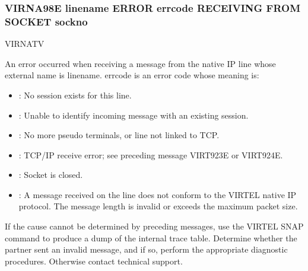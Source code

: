 \documentclass[letterpaper,10pt,english]{sphinxmanual}
\begin{document}
\subsubsection{VIRNA98E linename ERROR errcode RECEIVING FROM SOCKET sockno}
\label{\detokenize{messages:virna98e-linename-error-errcode-receiving-from-socket-sockno}}\begin{description}
\sphinxAtStartPar
VIRNATV

\sphinxAtStartPar
An error occurred when receiving a message from the native IP line whose external name is linename. errcode is an error code whose meaning is:
\begin{itemize}
\item {} 
 : No session exists for this line.

\item {} 
 : Unable to identify incoming message with an existing session.

\item {} 
 : No more pseudo terminals, or line not linked to TCP.

\item {} 
 : TCP/IP receive error; see preceding message VIRT923E or VIRT924E.

\item {} 
 : Socket is closed.

\item {} 
 : A message received on the line does not conform to the VIRTEL native IP protocol. The message length is invalid or exceeds the maximum packet size.

\end{itemize}

\sphinxAtStartPar
If the cause cannot be determined by preceding messages, use the VIRTEL SNAP command to produce a dump of the internal trace table. Determine whether the partner sent an invalid message, and if so, perform the appropriate diagnostic procedures. Otherwise contact technical support.

\end{description}
\end{document}
